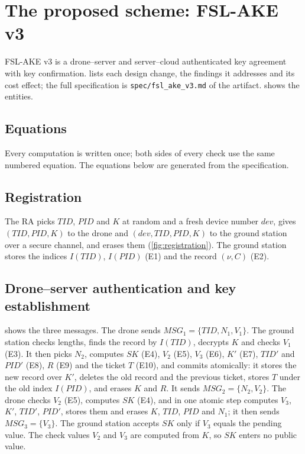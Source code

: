 \section{The proposed scheme: FSL-AKE v3}\label{sec:scheme}

FSL-AKE v3 is a drone--server and server--cloud authenticated key agreement with key confirmation.  lists
each design change, the findings it addresses and its cost effect; the full specification is \texttt{spec/fsl\_ake\_v3.md} of
the artifact.  shows the entities.



\subsection{Equations}
Every computation is written once; both sides of every check use the same numbered equation. The equations below are
generated from the specification.
{\small\setlength{\multlinegap}{0pt}}

\subsection{Registration}
The RA picks $TID$, $PID$ and $K$ at random and a fresh device number $dev$, gives $(TID, PID, K)$ to the drone and
$(dev, TID, PID, K)$ to the ground station over a secure channel, and erases them (\cref{fig:registration}). The ground station
stores the indices $I(TID)$, $I(PID)$ (E1) and the record $(\nu, C)$ (E2).


\subsection{Drone--server authentication and key establishment}
 shows the three messages. The drone sends $MSG_1 = \{TID, N_1, V_1\}$. The ground station checks lengths, finds
the record by $I(TID)$, decrypts $K$ and checks $V_1$ (E3). It then picks $N_2$, computes $SK$ (E4), $V_2$ (E5), $V_3$ (E6),
$K'$ (E7), $TID'$ and $PID'$ (E8), $R$ (E9) and the ticket $T$ (E10), and commits atomically: it stores the new record over $K'$,
deletes the old record and the previous ticket, stores $T$ under the old index $I(PID)$, and erases $K$ and $R$. It sends
$MSG_2 = \{N_2, V_2\}$. The drone checks $V_2$ (E5), computes $SK$ (E4), and in one atomic step computes $V_3$, $K'$, $TID'$,
$PID'$, stores them and erases $K$, $TID$, $PID$ and $N_1$; it then sends $MSG_3 = \{V_3\}$. The ground station accepts $SK$
only if $V_3$ equals the pending value. The check values $V_2$ and $V_3$ are computed from $K$, so $SK$ enters no public value.


